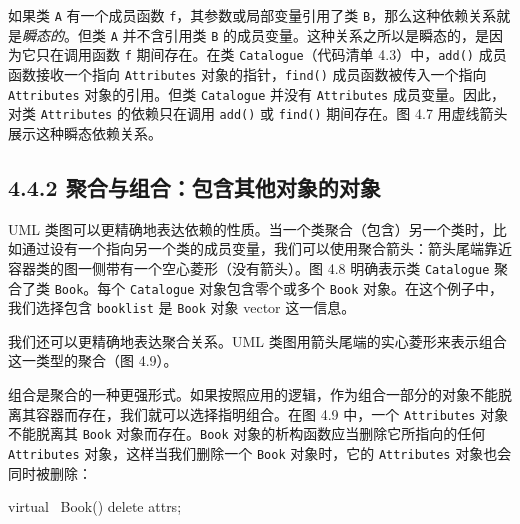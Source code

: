 如果类 \texttt{A} 有一个成员函数 \texttt{f}，其参数或局部变量引用了类 \texttt{B}，那么这种依赖关系就是\emph{瞬态的}。但类 \texttt{A} 并不含引用类 \texttt{B} 的成员变量。这种关系之所以是瞬态的，是因为它只在调用函数 \texttt{f} 期间存在。在类 \texttt{Catalogue}（代码清单 4.3）中，\texttt{add()} 成员函数接收一个指向 \texttt{Attributes} 对象的指针，\texttt{find()} 成员函数被传入一个指向 \texttt{Attributes} 对象的引用。但类 \texttt{Catalogue} 并没有 \texttt{Attributes} 成员变量。因此，对类 \texttt{Attributes} 的依赖只在调用 \texttt{add()} 或 \texttt{find()} 期间存在。图 4.7 用虚线箭头展示这种瞬态依赖关系。


\subsection{4.4.2 聚合与组合：包含其他对象的对象}

UML 类图可以更精确地表达依赖的性质。当一个类聚合（包含）另一个类时，比如通过设有一个指向另一个类的成员变量，我们可以使用聚合箭头：箭头尾端靠近容器类的图一侧带有一个空心菱形（没有箭头）。图 4.8 明确表示类 \texttt{Catalogue} 聚合了类 \texttt{Book}。每个 \texttt{Catalogue} 对象包含零个或多个 \texttt{Book} 对象。在这个例子中，我们选择包含 \texttt{booklist} 是 \texttt{Book} 对象 vector 这一信息。


我们还可以更精确地表达聚合关系。UML 类图用箭头尾端的实心菱形来表示组合这一类型的聚合（图 4.9）。

组合是聚合的一种更强形式。如果按照应用的逻辑，作为组合一部分的对象不能脱离其容器而存在，我们就可以选择指明组合。在图 4.9 中，一个 \texttt{Attributes} 对象不能脱离其 \texttt{Book} 对象而存在。\texttt{Book} 对象的析构函数应当删除它所指向的任何 \texttt{Attributes} 对象，这样当我们删除一个 \texttt{Book} 对象时，它的 \texttt{Attributes} 对象也会同时被删除：

\begin{codebox}
    virtual ~Book() { delete attrs; }
\end{codebox}

